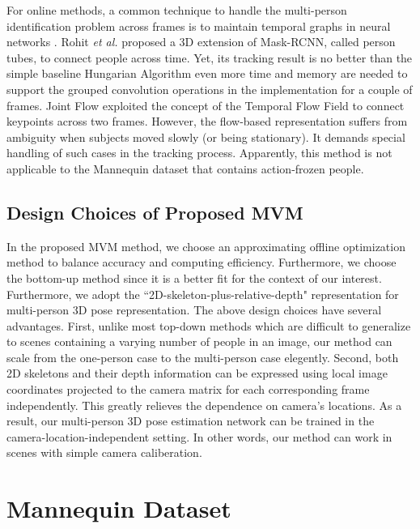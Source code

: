 \documentclass{article}
\begin{document}
For online methods, a common technique to handle the multi-person
identification problem across frames is to maintain temporal graphs in
neural networks \cite{doering2018joint,girdhar2018detect,
sedai2013gaussian}.  Rohit {\em et al.} \cite{girdhar2018detect}
proposed a 3D extension of Mask-RCNN, called person tubes, to connect
people across time. Yet, its tracking result is no better than the
simple baseline Hungarian Algorithm \cite{iqbal2017posetrack} even more
time and memory are needed to support the grouped convolution operations
in the implementation for a couple of frames. Joint Flow
\cite{dong2019fast} exploited the concept of the Temporal Flow Field to
connect keypoints across two frames. However, the flow-based
representation suffers from ambiguity when subjects moved slowly (or
being stationary). It demands special handling of such cases in the
tracking process. Apparently, this method is not applicable to the
Mannequin dataset that contains action-frozen people. 

\subsection{Design Choices of Proposed MVM}

In the proposed MVM method, we choose an approximating offline
optimization method to balance accuracy and computing efficiency.
Furthermore, we choose the bottom-up method since it is a better fit for
the context of our interest. Furthermore, we adopt the
``2D-skeleton-plus-relative-depth" representation for multi-person 3D
pose representation. The above design choices have several advantages.
First, unlike most top-down methods which are difficult to generalize to
scenes containing a varying number of people in an image, our method can
scale from the one-person case to the multi-person case elegently.
Second, both 2D skeletons and their depth information can be expressed
using local image coordinates projected to the camera matrix for each
corresponding frame independently. This greatly relieves the dependence
on camera's locations. As a result, our multi-person 3D pose estimation
network can be trained in the camera-location-independent setting. In
other words, our method can work in scenes with simple camera
caliberation. 

\section{Mannequin Dataset}\label{sec:dataset}
\end{document}
